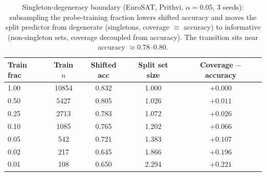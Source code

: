\documentclass[11pt]{article}
\begin{document}
\begin{table}[t]\centering\small
\caption{Singleton-degeneracy boundary (EuroSAT, Prithvi, $\alpha{=}0.05$, 3 seeds): subsampling the
probe-training fraction lowers shifted accuracy and moves the split predictor from degenerate (singletons,
coverage $\equiv$ accuracy) to informative (non-singleton sets, coverage decoupled from accuracy). The
transition sits near accuracy $\approx0.78$--$0.80$.}\label{tab:singleton}
\begin{tabular}{lcccc}
\toprule
Train frac & Train $n$ & Shifted acc & Split set size & Coverage $-$ accuracy \\
\midrule
1.00 & 10854 & 0.832 & 1.000 & $+0.000$ \\
0.50 & 5427  & 0.805 & 1.026 & $+0.011$ \\
0.25 & 2713  & 0.783 & 1.072 & $+0.026$ \\
0.10 & 1085  & 0.765 & 1.202 & $+0.066$ \\
0.05 & 542   & 0.721 & 1.383 & $+0.107$ \\
0.02 & 217   & 0.645 & 1.866 & $+0.196$ \\
0.01 & 108   & 0.650 & 2.294 & $+0.221$ \\
\bottomrule
\end{tabular}
\end{table}
\end{document}
